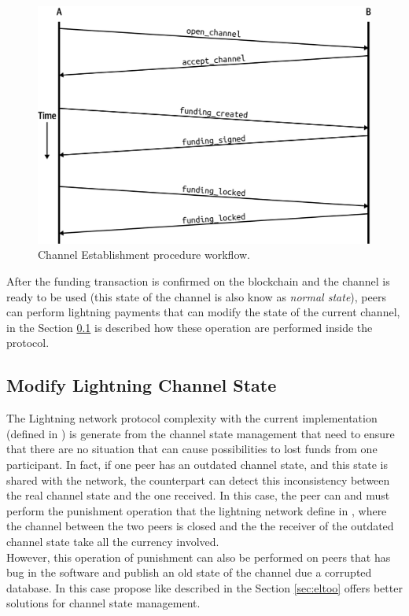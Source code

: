 \begin{figure}[h]
  \begin{center}
  \includegraphics[width=0.6\columnwidth]{imgs/mtln_0703.png}
  \end{center}
  \caption{Channel Establishment procedure workflow.}
  \label{fig:channel-establishment}
\end{figure}

After the funding transaction is confirmed on the blockchain and the channel is ready to be used (this state of the channel is also know as \emph{normal state}),
peers can perform lightning payments that can modify the state of the current channel, in the Section \ref{sec:modify_channel_state} is described how
these operation are performed inside the protocol.

\subsection{Modify Lightning Channel State}
\label{sec:modify_channel_state}


The Lightning network protocol complexity with the current implementation (defined in \cite{lightning-bolts})
is generate from the channel state management that need to ensure that there are no situation that can
cause  possibilities to lost funds from one participant.
In fact, if one peer has an outdated channel state, and this state is shared with the network, the counterpart can
detect this inconsistency between the real channel state and the one received. In this case, the peer can and must
perform the punishment operation that the lightning network define in \cite{bolt2}, where the channel between the two peers
is closed and the the receiver of the outdated channel state take all the currency involved.\\
However, this operation of punishment can also be performed on peers that has bug in the software and publish an old state of the
channel due a corrupted database. In this case propose like \cite{eltoo} described in the Section \ref{sec:eltoo} offers
better solutions for channel state management.

